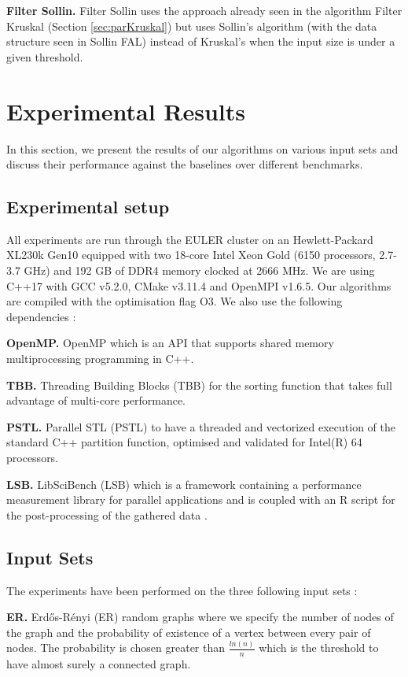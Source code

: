 \documentclass[letterpaper]{article}
\newcommand{\mypar}[1]{{\bf #1.}}
\begin{document}
\mypar{Filter Sollin} Filter Sollin uses the approach already seen in the algorithm Filter Kruskal (Section \ref{sec:parKruskal}) but uses Sollin's algorithm (with the data structure seen in Sollin FAL) instead of Kruskal's when the input size is under a given threshold.


\section{Experimental Results}\label{sec:exp}

In this section, we present the results of our algorithms on various input sets and discuss their performance against the baselines over different benchmarks.

\subsection{Experimental setup} \label{sec:setup}

All experiments are run through the EULER cluster on an Hewlett-Packard XL230k Gen10 equipped with two 18-core Intel Xeon Gold (6150 processors, 2.7-3.7 GHz) and 192 GB of DDR4 memory clocked at 2666 MHz. We are using C++17 with GCC v5.2.0, CMake v3.11.4 and OpenMPI v1.6.5. Our algorithms are compiled with the optimisation flag O3. We also use the following dependencies :

\mypar{OpenMP} OpenMP which is an API that supports shared memory multiprocessing programming in C++.

\mypar{TBB} Threading Building Blocks (TBB) for the sorting function that takes full advantage of multi-core performance.

\mypar{PSTL} Parallel STL (PSTL) to have a threaded and vectorized execution of the standard C++ partition function, optimised and validated for Intel(R) 64 processors.

\mypar{LSB} LibSciBench (LSB) which is a framework containing a performance measurement library for parallel applications and is coupled with an R script for the post-processing of the gathered data \cite{benchmarking} \cite{measuring}. 


\subsection{Input Sets}
The experiments have been performed on the three following input sets :

\mypar{ER} Erd\H{o}s-R\'{e}nyi (ER) random graphs where we specify the number of nodes of the graph and the probability of existence of a vertex between every pair of nodes. The probability is chosen greater than $\frac{ln(n)}{n}$ which is the threshold to have almost surely a connected graph.
\end{document}
